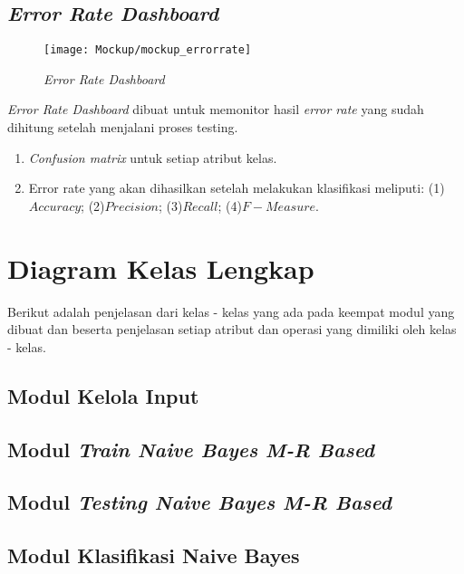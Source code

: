 \subsection{\textit{Error Rate Dashboard}}
\begin{figure}[H]
	\centering
	\texttt{[image: Mockup/mockup\_errorrate]}
	\caption[\textit{Error Rate Dashboard}]{\textit{Error Rate Dashboard}}
	\label{fig:Error Rate Dashboard}
\end{figure}
\textit{Error Rate Dashboard} dibuat untuk memonitor hasil \textit{error rate} yang sudah dihitung setelah menjalani proses testing. 
\begin{enumerate}
	\item \textit{Confusion matrix} untuk setiap atribut kelas.
	\item Error rate yang akan dihasilkan setelah melakukan klasifikasi meliputi: (1)$Accuracy$; (2)$Precision$; (3)$Recall$; (4)$F-Measure$.
\end{enumerate}



\section{Diagram Kelas Lengkap}
Berikut adalah penjelasan dari kelas - kelas yang ada pada keempat modul yang dibuat dan  beserta penjelasan setiap atribut dan operasi yang dimiliki oleh kelas - kelas.

\subsection{Modul Kelola Input}


\subsection{Modul \textit{Train Naive Bayes M-R Based}}


\subsection{Modul \textit{Testing Naive Bayes M-R Based}}


\subsection{Modul Klasifikasi Naive Bayes}


